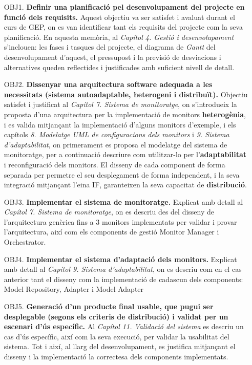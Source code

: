 \begin{itemize}
\item[OBJ1.] \textbf{Definir una planificació pel desenvolupament del projecte en funció dels requisits.}
\subitem Aquest objectiu va ser satisfet i avaluat durant el curs de GEP, on es van identificar tant els requisits del projecte com la seva planificació. En aquesta memòria, al \textit{Capítol 4. Gestió i desenvolupament} s'inclouen: les fases i tasques del projecte, el diagrama de \textit{Gantt} del desenvolupament d'aquest, el pressupost i la previsió de desviacions i alternatives queden reflectides i justificades amb suficient nivell de detall.
\item[OBJ2.] \textbf{ Dissenyar una arquitectura software adequada a les necessitats (sistema autoadaptable, heterogeni i distribuït).}
\subitem Objectiu satisfet i justificat al \textit{Capítol 7. Sistema de monitoratge}, on s'introdueix la proposta d'una arquitectura per la implementació de monitors \textbf{heterogènia}, i es valida mitjançant la implementació d'alguns monitors d'exemple, i els capítols \textit{8. Modelatge UML de configuracions dels monitors} i \textit{9. Sistema d'adaptabilitat}, on primerament es proposa el modelatge del sistema de monitoratge, per a continuació descriure com utilitzar-lo per l'\textbf{adaptabilitat} i reconfiguració dels monitors. El disseny de cada component de forma separada per permetre el seu desplegament de forma independent, i la seva integració mitjançant l'eina IF, garanteixen la seva capacitat de \textbf{distribució}.
\item[OBJ3.] \textbf{Implementar el sistema de monitoratge.}
\subitem Explicat amb detall al \textit{Capítol 7. Sistema de monitoratge}, on es descriu des del disseny de l'arquitectura genèrica fins a 3 monitors implementats per validar i provar l'arquitectura, així com els components de gestió Monitor Manager i Orchestrator.
\item[OBJ4.] \textbf{Implementar el sistema d'adaptació dels monitors.}
\subitem Explicat amb detall al \textit{Capítol 9. Sistema d'adaptabilitat}, on es descriu com en el cas anterior tant el disseny com la implementació de cadascun dels components: Model Repository, Adapter i Model Adapter
\item[OBJ5.] \textbf{Generació d’un producte final usable, que pugui ser desplegable (segons els criteris de distribució) i validat per un escenari d'ús específic.}
\subitem Al \textit{Capítol 11. Validació del sistema} es descriu un cas d'ús específic, així com la seva execució, per validar la usabilitat del sistema. Tot i així, al llarg del desenvolupament, es justifica mitjançant el disseny i la implementació la correctesa dels components implementats.

\end{itemize}
